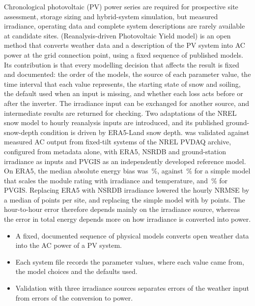 \documentclass[11pt]{article}
\begin{document}
Chronological photovoltaic (PV) power series are required for prospective site assessment, storage sizing and hybrid-system simulation, but measured irradiance, operating data and complete system descriptions are rarely available at candidate sites. \RePV{} (Reanalysis-driven Photovoltaic Yield model) is an open method that converts weather data and a description of the PV system into AC power at the grid connection point, using a fixed sequence of published models. Its contribution is that every modelling decision that affects the result is fixed and documented: the order of the models, the source of each parameter value, the time interval that each value represents, the starting state of snow and soiling, the default used when an input is missing, and whether each loss acts before or after the inverter. The irradiance input can be exchanged for another source, and intermediate results are returned for checking. Two adaptations of the NREL snow model to hourly reanalysis inputs are introduced, and its published ground-snow-depth condition is driven by ERA5-Land snow depth. \RePV{} was validated against measured AC output from \vNInd{} fixed-tilt systems of the NREL PVDAQ archive, configured from metadata alone, with ERA5, NSRDB and ground-station irradiance as inputs and PVGIS as an independently developed reference model. On ERA5, the median absolute energy bias was \vMedSysEraAbsBias\,\%, against \vMedRatEraAbsBias\,\% for a simple model that scales the module rating with irradiance and temperature, and \vMedPvgisAbsBias\,\% for PVGIS. Replacing ERA5 with NSRDB irradiance lowered the hourly NRMSE by a median of \vInputNrmseGain{} points per site, and replacing the simple model with \RePV{} by \vPathRatNrmseGainEra{} points. The hour-to-hour error therefore depends mainly on the irradiance source, whereas the error in total energy depends more on how irradiance is converted into power.

\begin{itemize}
    \item A fixed, documented sequence of physical models converts open weather data into the AC power of a PV system.
    \item Each system file records the parameter values, where each value came from, the model choices and the defaults used.
    \item Validation with three irradiance sources separates errors of the weather input from errors of the conversion to power.
\end{itemize}
\end{document}
